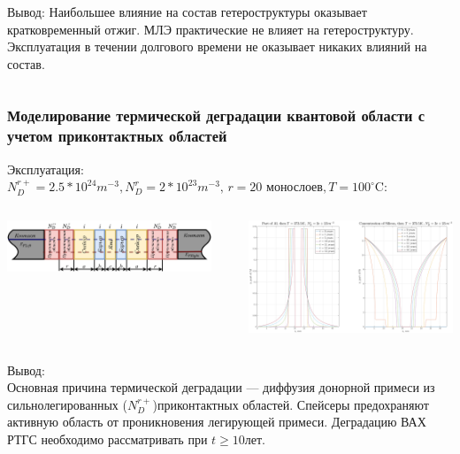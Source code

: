 \documentclass[10pt,pdf,hyperref={unicode},aspectratio={169}]{beamer}
\begin{document}
\begin{frame}
\begin{columns}
		{\color{blue} Вывод:} Наибольшее влияние на состав гетероструктуры оказывает кратковременный отжиг. МЛЭ практические не влияет на гетероструктуру. Эксплуатация в течении долгового времени не оказывает никаких влияний на состав.
	   	\newline\newline\newline\newline
	\end{columns}
\end{frame}

\begin{frame}
	\frametitle{Моделирование термической деградации квантовой области с учетом приконтактных областей}
	{\large\color{blue} Эксплуатация:}\\
	{\color{red} $N_{D}^{r+} = 2.5*10^{24}m^{-3}, N_{D}^{r} = 2*10^{23}m^{-3},\,r=20\text{ монослоев},T = 100^\circ\text{C}$:}\\
	\begin{columns}
	   	\includegraphics[width=.99\linewidth,center]{assets/RTHSResearch}\\
		\rule[0mm]{0.2ex}{40mm}
	   	\includegraphics[width=.99\linewidth,center]{assets/DSi100}\\
	\end{columns}
	{\large\color{blue}Вывод:}\\
	Основная причина термической деградации --- диффузия донорной примеси из сильнолегированных ($N_{D}^{r+}$)приконтактных областей. Спейсеры предохраняют активную область от проникновения легирующей примеси. Деградацию ВАХ РТГС необходимо рассматривать при $t \geq 10$лет. 
\end{frame}
\end{document}
